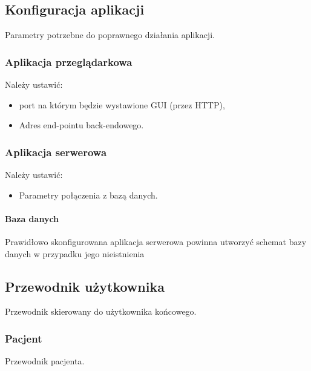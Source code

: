 \documentclass[polish,12pt]{aghthesis}
\begin{document}
\subsection{Konfiguracja aplikacji}
Parametry potrzebne do poprawnego działania aplikacji.
\subsubsection{Aplikacja przeglądarkowa}{Należy ustawić:
\begin{itemize}
    \item port na którym będzie wystawione GUI (przez HTTP),
    \item Adres end-pointu back-endowego.
\end{itemize}}
\subsubsection{Aplikacja serwerowa}{Należy ustawić:
\begin{itemize}
    \item Parametry połączenia z bazą danych.
\end{itemize}}
\paragraph{Baza danych}{Prawidłowo skonfigurowana aplikacja serwerowa powinna utworzyć schemat bazy danych w przypadku jego nieistnienia}


\subsection{Przewodnik użytkownika}
Przewodnik skierowany do użytkownika końcowego.
\subsubsection{Pacjent}
    Przewodnik pacjenta.
\end{document}
